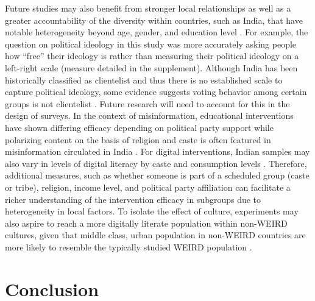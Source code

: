 \documentclass[empirical, authordate]{jote-new-article}
\begin{document}
Future studies may also benefit from stronger local relationships \parencite{Sircar2019} as well as a greater accountability of the diversity within countries, such as India, that have notable heterogeneity beyond age, gender, and education level \parencite{Deshmukh2019}. For example, the question on political ideology in this study was more accurately asking people how “free” their ideology is rather than measuring their political ideology on a left-right scale (measure detailed in the supplement). Although India has been historically classified as clientelist and thus there is no established scale to capture political ideology, some evidence suggests voting behavior among certain groups is not clientelist \parencite{Chibber2018}. Future research will need to account for this in the design of surveys. In the context of misinformation, educational interventions have shown differing efficacy depending on political party support \parencite{Badrinathan2021} while polarizing content on the basis of religion and caste is often featured in misinformation circulated in India \parencite{Al-Zaman2021, Arun2019, Campbell-Smith2019}. For digital interventions, Indian samples may also vary in levels of digital literacy by caste and consumption levels \parencite{Mothkoor2021}. Therefore, additional measures, such as whether someone is part of a scheduled group (caste or tribe), religion, income level, and political party affiliation can facilitate a richer understanding of the intervention efficacy in subgroups due to heterogeneity in local factors. To isolate the effect of culture, experiments may also aspire to reach a more digitally literate population within non-WEIRD cultures, given that middle class, urban population in non-WEIRD countries are more likely to resemble the typically studied WEIRD population \parencite{Ghai2021}.

\section{Conclusion}
\end{document}
